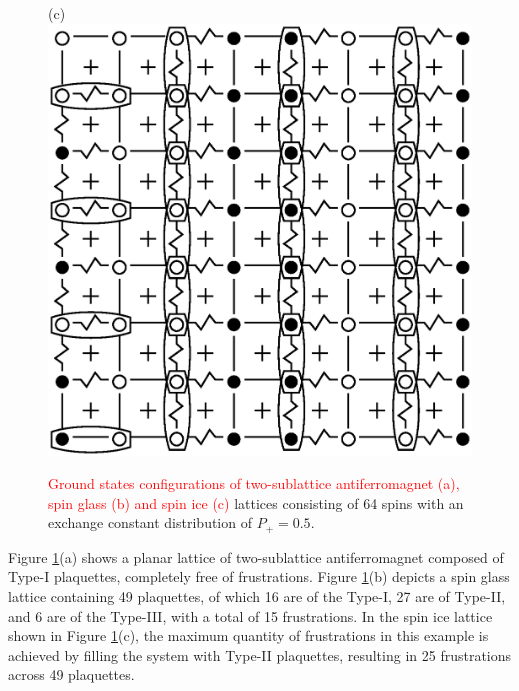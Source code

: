 \documentclass[preprint,12pt]{elsarticle}
\begin{document}
\begin{figure}[H]
\begin{minipage}[h]{0.3\linewidth}
		\end{minipage}
		\hfill
		\begin{minipage}[h]{0.3\linewidth}
			\centering(c)
			\includegraphics[width=1\linewidth]{pictures/SI_64_J0}
		\end{minipage}
		\hfill
		\caption{\textcolor{red}{Ground states configurations of two-sublattice antiferromagnet (a), spin glass (b) and spin ice (c)} lattices consisting of 64 spins with an exchange constant distribution of $P_+ = 0.5$.}
		\label{fig:cell_SI_SG_64}
		
	\end{figure}
	
	
	Figure \ref{fig:cell_SI_SG_64}(a) shows a planar lattice of two-sublattice antiferromagnet composed of Type-I plaquettes, completely free of frustrations.
	Figure \ref{fig:cell_SI_SG_64}(b) depicts a spin glass lattice containing 49 plaquettes, of which 16 are of the Type-I, 27 are of Type-II, and 6 are of the Type-III, with a total of 15 frustrations.
	In the spin ice lattice shown in Figure \ref{fig:cell_SI_SG_64}(c), the maximum quantity of frustrations in this example is achieved by filling the system with Type-II plaquettes, resulting in 25 frustrations across 49 plaquettes.
	
\end{document}
